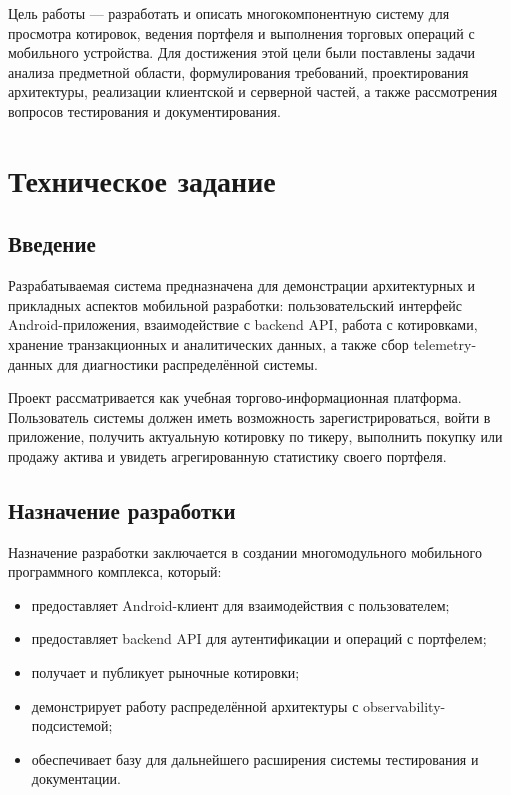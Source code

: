 \documentclass[12pt,a4paper]{article}
\begin{document}
Цель работы --- разработать и описать многокомпонентную систему для просмотра котировок, ведения портфеля и выполнения торговых операций с мобильного устройства. Для достижения этой цели были поставлены задачи анализа предметной области, формулирования требований, проектирования архитектуры, реализации клиентской и серверной частей, а также рассмотрения вопросов тестирования и документирования.

\section{Техническое задание}

\subsection{Введение}

Разрабатываемая система предназначена для демонстрации архитектурных и прикладных аспектов мобильной разработки: пользовательский интерфейс Android-приложения, взаимодействие с backend API, работа с котировками, хранение транзакционных и аналитических данных, а также сбор telemetry-данных для диагностики распределённой системы.

Проект рассматривается как учебная торгово-информационная платформа. Пользователь системы должен иметь возможность зарегистрироваться, войти в приложение, получить актуальную котировку по тикеру, выполнить покупку или продажу актива и увидеть агрегированную статистику своего портфеля.

\subsection{Назначение разработки}

Назначение разработки заключается в создании многомодульного мобильного программного комплекса, который:

\begin{itemize}[leftmargin=1.2cm]
    \item предоставляет Android-клиент для взаимодействия с пользователем;
    \item предоставляет backend API для аутентификации и операций с портфелем;
    \item получает и публикует рыночные котировки;
    \item демонстрирует работу распределённой архитектуры с observability-подсистемой;
    \item обеспечивает базу для дальнейшего расширения системы тестирования и документации.
\end{itemize}
\end{document}
